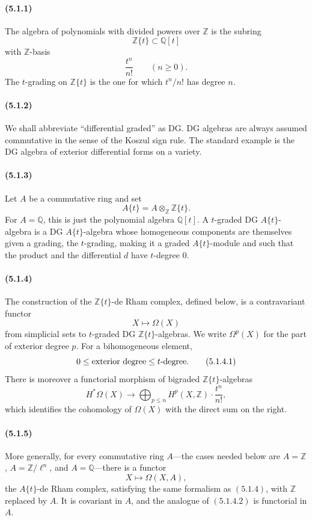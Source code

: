 \documentclass[11pt]{article}
\theoremstyle{remark}
\newcommand{\ZZ}{\mathbb{Z}}
\newcommand{\QQ}{\mathbb{Q}}
\begin{document}
\paragraph{(5.1.1)}
The algebra of polynomials with divided powers over \(\ZZ\) is the subring
\[
\ZZ\{t\}\subset \QQ[t]
\]
with \(\ZZ\)-basis
\[
\frac{t^n}{n!}\qquad (n\ge 0).
\]
The \(t\)-grading on \(\ZZ\{t\}\) is the one for which \(t^n/n!\) has degree \(n\).

\paragraph{(5.1.2)}
We shall abbreviate ``differential graded'' as DG.  DG algebras are always assumed commutative in the sense of the Koszul sign rule.  The standard example is the DG algebra of exterior differential forms on a variety.

\paragraph{(5.1.3)}
Let \(A\) be a commutative ring and set
\[
A\{t\}=A\otimes_{\ZZ}\ZZ\{t\}.
\]
For \(A=\QQ\), this is just the polynomial algebra \(\QQ[t]\).  A \(t\)-graded DG \(A\{t\}\)-algebra is a DG \(A\{t\}\)-algebra whose homogeneous components are themselves given a grading, the \(t\)-grading, making it a graded \(A\{t\}\)-module and such that the product and the differential \(d\) have \(t\)-degree \(0\).

\paragraph{(5.1.4)}
The construction of the \(\ZZ\{t\}\)-de Rham complex, defined below, is a contravariant functor
\[
X\longmapsto \Omega(X)
\]
from simplicial sets to \(t\)-graded DG \(\ZZ\{t\}\)-algebras.  We write \(\Omega^p(X)\) for the part of exterior degree \(p\).  For a bihomogeneous element,
\[
0\le \hbox{exterior degree}\le \hbox{\(t\)-degree}. \tag{5.1.4.1}
\]
There is moreover a functorial morphism of bigraded \(\ZZ\{t\}\)-algebras
\[
H^*\Omega(X)\longrightarrow
\bigoplus_{p\le n}H^p(X,\ZZ)\cdot \frac{t^n}{n!}, \tag{5.1.4.2}
\]
which identifies the cohomology of \(\Omega(X)\) with the direct sum on the right.

\paragraph{(5.1.5)}
More generally, for every commutative ring \(A\)---the cases needed below are \(A=\ZZ\), \(A=\ZZ/\ell^n\), and \(A=\QQ\)---there is a functor
\[
X\longmapsto \Omega(X,A),
\]
the \(A\{t\}\)-de Rham complex, satisfying the same formalism as \((5.1.4)\), with \(\ZZ\) replaced by \(A\).  It is covariant in \(A\), and the analogue of \((5.1.4.2)\) is functorial in \(A\).
\end{document}
